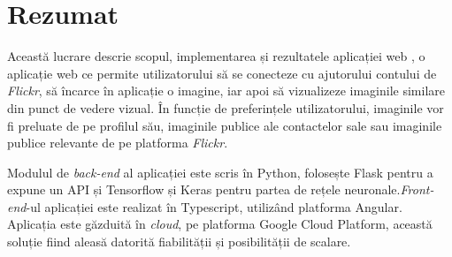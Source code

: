 \chapter*{Rezumat} 

Această lucrare descrie scopul, implementarea și rezultatele aplicației web {\applicationtitle}, o aplicație web ce permite utilizatorului să se conecteze cu ajutorului contului de \textit{Flickr}, să încarce în aplicație o imagine, iar apoi să vizualizeze imaginile similare din punct de vedere vizual. În funcție de preferințele utilizatorului, imaginile vor fi preluate de pe profilul său, imaginile publice ale contactelor sale sau imaginile publice relevante de pe platforma \textit{Flickr}.

Modulul de \textit{back-end} al aplicației este scris în Python, folosește Flask pentru a expune un API și Tensorflow și Keras pentru partea de rețele neuronale.\textit{Front-end}-ul aplicației este realizat în Typescript, utilizând platforma Angular. Aplicația este găzduită în \textit{cloud}, pe platforma Google Cloud Platform, această soluție fiind aleasă datorită fiabilității și posibilității de scalare.
